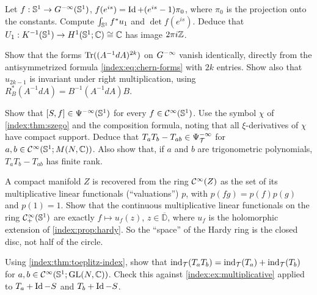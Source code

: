 \begin{exercise}\label{index:ex:U1-circle}
  Let $f:\mathbb{S}^1\to G^{-\infty}(\mathbb{S}^1)$,
  $f(e^{is})=\operatorname{Id}+(e^{is}-1)\pi_0$, where $\pi_0$ is the projection onto the
  constants. Compute $\int_{\mathbb{S}^1}f^*u_1$ and $\det f(e^{is})$. Deduce
  that $U_1:K^{-1}(\mathbb{S}^1)\to H^1(\mathbb{S}^1;\mathbb{C})\cong\mathbb{C}$ has image
  $2\pi i\mathbb{Z}$.
\end{exercise}

\begin{exercise}\label{index:ex:even-vanish}
  Show that the forms $\operatorname{Tr}((A^{-1}dA)^{2k})$ on $G^{-\infty}$ vanish identically,
  directly from the antisymmetrized formula \eqref{index:eq:chern-forms} with
  $2k$ entries. Show also that $u_{2k-1}$ is invariant under right
  multiplication, using $R_B^*(A^{-1}dA)=B^{-1}(A^{-1}dA)B$.
\end{exercise}

\begin{exercise}\label{index:ex:commutator}
  Show that $[S,f]\in\Psi^{-\infty}(\mathbb{S}^1)$ for every
  $f\in\mathcal{C}^\infty(\mathbb{S}^1)$. Use the symbol $\chi$ of \cref{index:thm:szego} and
  the composition formula, noting that all $\xi$-derivatives of $\chi$ have
  compact support. Deduce that $T_aT_b-T_{ab}\in\Psi^{-\infty}_{\mathcal T}$ for
  $a,b\in\mathcal{C}^\infty(\mathbb{S}^1;M(N,\mathbb{C}))$. Also show that, if $a$ and $b$ are
  trigonometric polynomials, $T_aT_b-T_{ab}$ has finite rank.
\end{exercise}

\begin{exercise}\label{index:ex:valuations}
  A compact manifold $Z$ is recovered from the ring $\mathcal{C}^\infty(Z)$ as the set of
  its multiplicative linear functionals (``valuations'') $p$, with
  $p(fg)=p(f)p(g)$ and $p(1)=1$. Show that the continuous multiplicative
  linear functionals on the ring $\mathcal{C}^\infty_{+}(\mathbb{S}^1)$ are exactly
  $f\mapsto u_f(z)$, $z\in\overline{\mathbb D}$, where $u_f$ is the
  holomorphic extension of \cref{index:prop:hardy}. So the ``space'' of the
  Hardy ring is the closed disc, not half of the circle.
\end{exercise}

\begin{exercise}\label{index:ex:toeplitz-product}
  Using \cref{index:thm:toeplitz-index}, show that
  $\operatorname{ind}_{\mathcal T}(T_aT_b)=\operatorname{ind}_{\mathcal T}(T_a)+\operatorname{ind}_{\mathcal T}(T_b)$
  for $a,b\in\mathcal{C}^\infty(\mathbb{S}^1;\operatorname{GL}(N,\mathbb{C}))$. Check this against
  \cref{index:ex:multiplicative} applied to $T_a+\operatorname{Id}-S$ and $T_b+\operatorname{Id}-S$.
\end{exercise}

